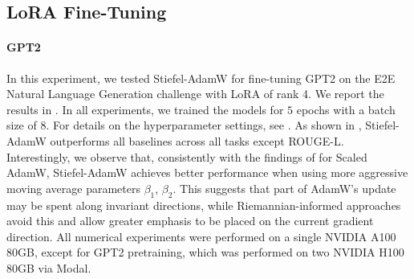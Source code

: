 \documentclass[11pt,a4paper]{article}
\numberwithin{equation}{section}
\newcommand{\algname}{Stiefel-AdamW}
\theoremstyle{plain}
\theoremstyle{definition}
\theoremstyle{remark}
\begin{document}
\subsection{LoRA Fine-Tuning}\paragraph{GPT2} In this experiment, we tested \algname{} for fine-tuning GPT2 on the E2E Natural Language Generation challenge \citep{novikova2017e2e} with LoRA of rank 4. We report the results in . In all experiments, we trained the models for $5$ epochs with a batch size of $8$. For details on the hyperparameter settings, see .
As shown in , \algname{} outperforms all baselines across all tasks except ROUGE-L. Interestingly, we observe that, consistently with the findings of \cite{ZhangPilanci2024} for Scaled AdamW, \algname{} achieves better performance when using more aggressive moving average parameters $\beta_1$, $\beta_2$. This suggests that part of AdamW's update may be spent along invariant directions, while Riemannian-informed approaches avoid this and allow greater emphasis to be placed on the current gradient direction. All numerical experiments were performed on a single NVIDIA A100 80GB, except for GPT2 pretraining, which was performed on two NVIDIA H100 80GB via Modal.
\end{document}
